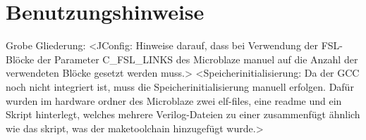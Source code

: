 \chapter{Benutzungshinweise}
Grobe Gliederung:
<JConfig: Hinweise darauf, dass bei Verwendung der FSL-Blöcke der Parameter C\_FSL\_LINKS des Microblaze manuel auf die Anzahl der verwendeten Blöcke gesetzt werden muss.>
<Speicherinitialisierung: Da der GCC noch nicht integriert ist, muss die Speicherinitialisierung manuell erfolgen. Dafür wurden im hardware ordner des Microblaze zwei elf-files, eine readme und ein Skript hinterlegt, welches mehrere Verilog-Dateien zu einer zusammenfügt ähnlich wie das skript, was der maketoolchain hinzugefügt wurde.>